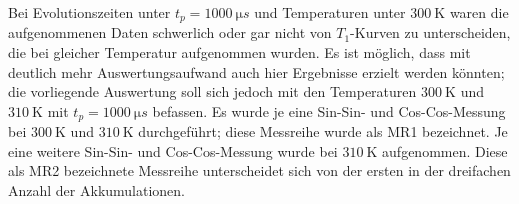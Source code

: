 Bei Evolutionszeiten unter $t_p = \SI{1000}{\micro s}$ und Temperaturen unter $\SI{300}{\kelvin}$ waren die aufgenommenen Daten schwerlich oder gar nicht von $T_1$-Kurven zu unterscheiden, die bei gleicher Temperatur aufgenommen wurden. Es ist möglich, dass mit deutlich mehr Auswertungsaufwand auch hier Ergebnisse erzielt werden könnten; die vorliegende Auswertung soll sich jedoch mit den Temperaturen $\SI{300}{\kelvin}$ und $\SI{310}{\kelvin}$ mit $t_p = \SI{1000}{\micro s}$ befassen. Es wurde je eine Sin-Sin- und Cos-Cos-Messung bei $\SI{300}{\kelvin}$ und $\SI{310}{\kelvin}$ durchgeführt; diese Messreihe wurde als MR1 bezeichnet. Je eine weitere Sin-Sin- und Cos-Cos-Messung wurde bei $\SI{310}{\kelvin}$ aufgenommen. Diese als MR2 bezeichnete Messreihe unterscheidet sich von der ersten in der dreifachen Anzahl der Akkumulationen.

